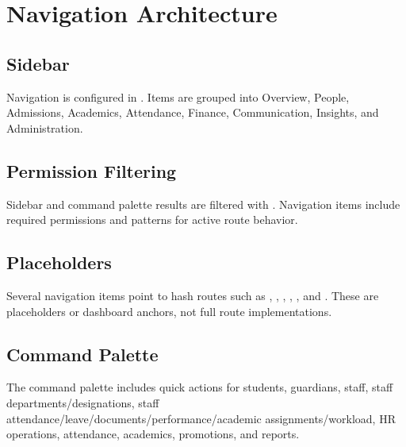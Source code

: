 \chapter{Navigation Architecture}

\section{Sidebar}
Navigation is configured in . Items are grouped into Overview, People, Admissions, Academics, Attendance, Finance, Communication, Insights, and Administration.

\section{Permission Filtering}
Sidebar and command palette results are filtered with . Navigation items include required permissions and  patterns for active route behavior.

\section{Placeholders}
Several navigation items point to hash routes such as , , , , , and . These are placeholders or dashboard anchors, not full route implementations.

\section{Command Palette}
The command palette includes quick actions for students, guardians, staff, staff departments/designations, staff attendance/leave/documents/performance/academic assignments/workload, HR operations, attendance, academics, promotions, and reports.
